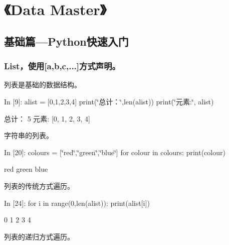\documentclass[letterpaper,10pt,english]{sphinxmanual}
\def\PYGZdq{\char`\"}
\begin{document}
\section{《Data Master》}
\label{pystart_databasic:_u300aData-Master_u300b}\label{pystart_databasic::doc}\begin{quote}
\end{quote}


\subsection{基础篇—Python快速入门}
\label{pystart_databasic:_u57fa_u7840_u7bc7_u2014Python_u5feb_u901f_u5165_u95e8}\begin{quote}
\end{quote}


\subsubsection{List，使用{[}a,b,c,...{]}方式声明。}
\label{pystart_databasic:List_uff0c_u4f7f_u7528_a,b,c,...__u65b9_u5f0f_u58f0_u660e_u3002}
列表是基础的数据结构。

\begin{OriginalVerbatim}[commandchars=\\\{\}]
\textcolor{nbsphinxin}{In [9]: }alist = [0,1,2,3,4]
        print(\PYGZdq{}总计：\PYGZdq{},len(alist))
        print(\PYGZdq{}元素:\PYGZdq{}, alist)
\end{OriginalVerbatim}
\begin{OriginalVerbatim}[commandchars=\\\{\}]
总计： 5
元素: [0, 1, 2, 3, 4]
\end{OriginalVerbatim}
字符串的列表。

\begin{OriginalVerbatim}[commandchars=\\\{\}]
\textcolor{nbsphinxin}{In [20]: }colours = [\PYGZdq{}red\PYGZdq{},\PYGZdq{}green\PYGZdq{},\PYGZdq{}blue\PYGZdq{}]
         for colour in colours:
             print(colour)
\end{OriginalVerbatim}
\begin{OriginalVerbatim}[commandchars=\\\{\}]
red
green
blue
\end{OriginalVerbatim}
列表的传统方式遍历。

\begin{OriginalVerbatim}[commandchars=\\\{\}]
\textcolor{nbsphinxin}{In [24]: }for i in range(0,len(alist)):
             print(alist[i])
\end{OriginalVerbatim}
\begin{OriginalVerbatim}[commandchars=\\\{\}]
0
1
2
3
4
\end{OriginalVerbatim}
列表的递归方式遍历。
\end{document}
